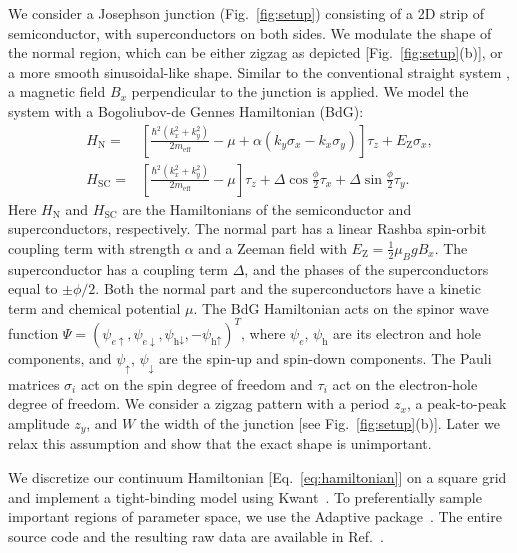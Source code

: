 \documentclass[english, twocolumn, 10pt, aps, superscriptaddress, floatfix, prb, citeautoscript]{revtex4-1}
\newcommand{\kx}{k_x}
\newcommand{\ky}{k_y}
\newcommand{\meff}{m_\text{eff}}
\renewcommand{\comment}[2]{#2}
\begin{document}
\comment{We consider a two-dimensional system with zigzag and BdG Hamiltonian.}
We consider a Josephson junction (Fig.~\ref{fig:setup}) consisting of a 2D strip of semiconductor, with superconductors on both sides.
We modulate the shape of the normal region, which can be either zigzag as depicted [Fig.~\ref{fig:setup}(b)], or a more smooth sinusoidal-like shape.
Similar to the conventional straight system \cite{Pientka2017}, a magnetic field $B_x$ perpendicular to the junction is applied.
We model the system with a Bogoliubov-de Gennes Hamiltonian (BdG):
\begin{subequations}
\begin{align}
    H_\textrm{N} = & \left[\frac{\hbar^2\left(\kx^2 + \ky^2\right)}{2\meff} - \mu + \alpha \left( \ky \sigma_x - \kx \sigma_y \right) \right] \tau_z
        + E_\text{Z} \sigma_x, \\
    H_\textrm{SC} = & \left[\frac{\hbar^2\left(\kx^2 + \ky^2\right)}{2\meff} - \mu\right] \tau_z
        + \Delta \cos{\frac{\phi}{2}} \tau_x + \Delta \sin{\frac{\phi}{2}} \tau_y.
\end{align}
\label{eq:hamiltonian}
\end{subequations}
Here $H_\textrm{N}$ and $H_\textrm{SC}$ are the Hamiltonians of the semiconductor and superconductors, respectively.
The normal part has a linear Rashba spin-orbit coupling term with strength $\alpha$ and a Zeeman field with $E_\text{Z}=\frac{1}{2} \mu_B g B_x$.
The superconductor has a coupling term $\Delta$, and the phases of the superconductors equal to $\pm\phi/2$.
Both the normal part and the superconductors have a kinetic term and chemical potential $\mu$.
The BdG Hamiltonian acts on the spinor wave function $\Psi={\left(\psi_{e\uparrow},\psi_{e\downarrow},\psi_{\textrm{h}\downarrow},-\psi_{\textrm{h}\uparrow}\right)}^{T}$, where $\psi_e$, $\psi_\textrm{h}$ are its electron and hole components, and $\psi_\uparrow$, $\psi_\downarrow$ are the spin-up and spin-down components.
The Pauli matrices $\sigma_{i}$ act on the spin degree of freedom and $\tau_{i}$ act on the electron-hole degree of freedom.
We consider a zigzag pattern with a period $z_x$, a peak-to-peak amplitude $z_y$, and $W$ the width of the junction [see Fig.~\ref{fig:setup}(b)].
Later we relax this assumption and show that the exact shape is unimportant.

\comment{We discretize the Hamiltonian and simulate it with Kwant.}
We discretize our continuum Hamiltonian [Eq.~\eqref{eq:hamiltonian}] on a square grid and implement a tight-binding model using Kwant~\cite{Groth2014}.
To preferentially sample important regions of parameter space, we use the Adaptive package~\cite{Nijholt2019a}.
The entire source code and the resulting raw data are available in Ref.~.
\end{document}
